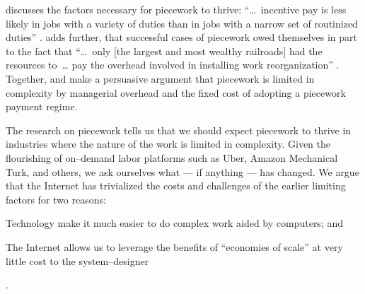 \documentclass[trackingWork]{subfiles}
\begin{document}
\citeauthor{Brown01041990} discusses the factors necessary for piecework to thrive:
    ``\dots~incentive pay is less likely in jobs with
    a variety of duties than in jobs with a narrow set of routinized duties''
\cite{Brown01041990}.
\citeauthor{10.2307/23702539} adds further, that
successful cases of piecework owed themselves in part to the fact that
    ``\dots~only [the largest and most wealthy railroads] had the resources to~\dots
    pay the overhead involved in installing work reorganization''
\cite{10.2307/23702539}.
Together, \citeauthor{10.2307/23702539} and \citeauthor{Brown01041990}
make a persuasive argument that piecework is limited in complexity by
managerial overhead and the fixed cost of adopting a piecework payment regime.


The research on piecework tells us that
we should expect piecework to thrive in industries where
the nature of the work is limited in complexity.
Given the flourishing of on--demand labor platforms such as
Uber, Amazon Mechanical Turk, and others, we ask ourselves
what --- if anything --- has changed.
We argue that the Internet has trivialized the costs and challenges of the earlier limiting factors for two reasons:
\begin{inlinelist}
  \item Technology make it much easier to do complex work aided by computers; and %
  \item The Internet allows us to leverage the benefits of ``economies of scale'' at very little cost
        to the system--designer \cite{lessig2006code}
\end{inlinelist}.


\end{document}
